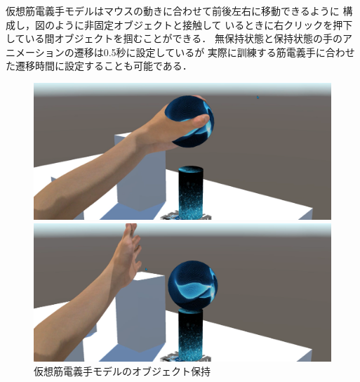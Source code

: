 \documentclass{ltjsarticle}
\begin{document}
		
		仮想筋電義手モデルはマウスの動きに合わせて前後左右に移動できるように
		構成し，図のように非固定オブジェクトと接触して
		いるときに右クリックを押下している間オブジェクトを掴むことができる．
		無保持状態と保持状態の手のアニメーションの遷移は0.5秒に設定しているが
		実際に訓練する筋電義手に合わせた遷移時間に設定することも可能である．

		\begin{figure}[H]
		\centering
		\begin{minipage}{0.4\columnwidth}
		\centering
		\includegraphics[width = \columnwidth]{figs/spheregrap2.png}
		\end{minipage}
		\hspace{0.05\columnwidth}
		\begin{minipage}{0.4\columnwidth}
		\centering
		\includegraphics[width = \columnwidth]{figs/spherereleace.png}
		\end{minipage}
		\vspace{-10pt}
		\caption{仮想筋電義手モデルのオブジェクト保持}
		\label{fig:spheregrap}
		\end{figure}
		\vspace{-32pt}
\end{document}
